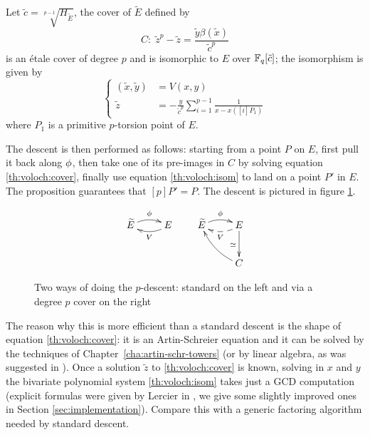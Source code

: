 \begin{proposition}
  \label{th:voloch}
  Let $\tilde{c} = \sqrt[p-1]{H_{\widetilde{E}}}$, the cover of
  $\widetilde{E}$ defined by
  \begin{equation}
    \label{th:voloch:cover}
    C:\; \tilde{z}^p - \tilde{z} = \frac{\tilde{y}\beta(\tilde{x})}{\tilde{c}^p}
  \end{equation}
  is an étale cover of degree $p$ and is isomorphic to $E$ over
  $\mathbb{F}_q[\tilde{c}]$; the isomorphism is given by
  \begin{equation}
    \label{th:voloch:isom}
    \left\{
      \begin{aligned}
        (\tilde{x}, \tilde{y}) &= V(x, y)\\
        \tilde{z} &= -\frac{y}{\tilde{c}^p}\sum_{i=1}^{p-1}\frac{1}{x - x([i]P_1)}
      \end{aligned}
    \right.
  \end{equation}
  where $P_1$ is a primitive $p$-torsion point of $E$.
\end{proposition}

The descent is then performed as follows: starting from a point $P$ on
$E$, first pull it back along $\phi$, then take one of its
pre-images in $C$ by solving equation \eqref{th:voloch:cover}, finally
use equation \eqref{th:voloch:isom} to land on a point $P'$ in $E$.
The proposition guarantees that $[p]P' = P$. The descent is pictured
in figure \ref{fig:voloch}.

\begin{figure}
  \centering
  \[
  \xymatrix{\widetilde{E}\ar@/^/[r]^{\frobisog} & E\ar@/^/[l]^{V}}
  \qquad
  \xymatrix{
    \widetilde{E}\ar@/^/[r]^{\frobisog} & E\ar@/^/@{-->}[l]^{V}\ar[d]_{\simeq}\\
    & C\ar@/^/[ul]
  }
  \]
  
  \caption{Two ways of doing the $p$-descent: standard on the left and via a degree $p$ cover on the right}
  \label{fig:voloch}
\end{figure}


The reason why this is more efficient than a standard descent is the
shape of equation \eqref{th:voloch:cover}: it is an Artin-Schreier
equation and it can be solved by the techniques of
Chapter~\ref{cha:artin-schr-towers} (or by linear algebra, as was
suggested in \cite{couveignes96}). Once a solution $\tilde{z}$ to
\eqref{th:voloch:cover} is known, solving in $x$ and $y$ the bivariate
polynomial system \eqref{th:voloch:isom} takes just a GCD computation
(explicit formulas were given by Lercier in
\cite[$\S$6.2]{lercier-algorithmique}, we give some slightly improved
ones in Section \ref{sec:implementation}). Compare this with a generic
factoring algorithm needed by standard descent.

